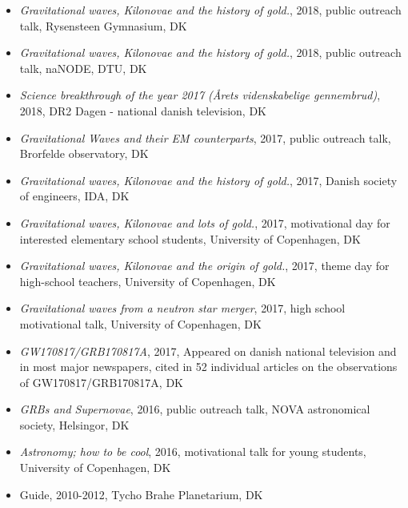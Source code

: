 \documentclass[12pt,letterpaper]{article}
\begin{document}
\begin{itemize}
	\item \emph{Gravitational waves, Kilonovae and the history of gold.}, 2018, public outreach talk, Rysensteen Gymnasium, DK
	\item \emph{Gravitational waves, Kilonovae and the history of gold.}, 2018, public outreach talk, naNODE, DTU, DK
    \item \emph{Science breakthrough of the year 2017 (\AA rets videnskabelige gennembrud)}, 2018, DR2 Dagen - national danish television, DK	
    \item \emph{Gravitational Waves and their EM counterparts}, 2017, public outreach talk, Brorfelde observatory, DK
    \item \emph{Gravitational waves, Kilonovae and the history of gold.}, 2017, Danish society of engineers, IDA, DK
    \item \emph{Gravitational waves, Kilonovae and lots of gold.}, 2017, motivational day for interested elementary school students, University of Copenhagen, DK
    \item \emph{Gravitational waves, Kilonovae and the origin of gold.}, 2017, theme day for high-school teachers, University of Copenhagen, DK
    \item \emph{Gravitational waves from a neutron star merger}, 2017, high school motivational talk, University of Copenhagen, DK
    \item \emph{GW170817/GRB170817A}, 2017, Appeared on danish national television and in most major newspapers, cited in 52 individual articles on the observations of GW170817/GRB170817A, DK    
    \item \emph{GRBs and Supernovae}, 2016, public outreach talk, NOVA astronomical society, Helsingor, DK
    \item \emph{Astronomy; how to be cool}, 2016, motivational talk for young students, University of Copenhagen, DK
    
    \item Guide, 2010-2012, Tycho Brahe Planetarium, DK

\end{itemize}
\end{document}

